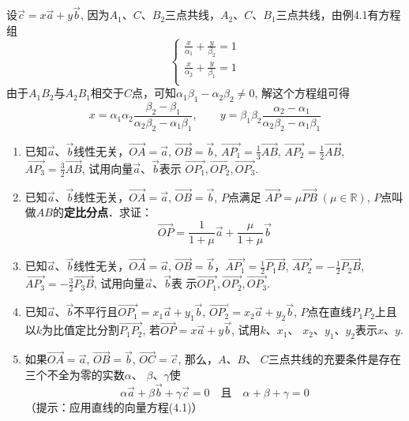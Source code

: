 \begin{solution}
    设$\vec{c}=x\vec{a}+y\vec{b}$, 因为$A_1$、$C$、$B_2$三点共线，$A_2$、$C$、$B_1$三点共线，由例4.1有方程组
\[\begin{cases}
    \frac{x}{\alpha_1}+\frac{y}{\beta_2}=1\\
    \frac{x}{\alpha_2}+\frac{y}{\beta_1}=1\\
\end{cases}\]
由于$A_1B_2$与$A_2B_1$相交于$C$点，可知$\alpha_1\beta_1-\alpha_2\beta_2\ne 0$, 解这个方程组可得
\[x=\alpha_1\alpha_2\frac{\beta_2-\beta_1}{\alpha_2\beta_2-\alpha_1\beta_1},\qquad y=\beta_1\beta_2\frac{\alpha_2-\alpha_1}{\alpha_2\beta_2-\alpha_1\beta_1}\]
\end{solution}

\begin{ex}
\begin{enumerate}
    \item 已知$\vec{a}$、$\vec{b}$线性无关，$\Vec{OA}=\vec{a}$, $\Vec{OB}=\vec{b}$, $\Vec{AP_1}=\frac{1}{3}\Vec{AB}$,
    $\Vec{AP_2}=\frac{1}{2}\Vec{AB}$, $\Vec{AP_3}=\frac{3}{2}\Vec{AB}$,
    试用向量$\vec{a}$、$\vec{b}$表示
    $\Vec{OP_1},\Vec{OP_2},\Vec{OP_3}$.

    \item 已知$\vec{a}$、$\vec{b}$线性无关，$\Vec{OA}=\vec{a}$, $\Vec{OB}=\vec{b}$, $P$点满足
    $\Vec{AP}=\mu \Vec{PB}\;  (\mu\in\mathbb{R})$, $P$点叫做$AB$的\textbf{定比分点}．求证：
\[\Vec{OP}=\frac{1}{1+\mu}\vec{a}+\frac{\mu}{1+\mu}\vec{b}\]
    \item 已知$\vec{a}$、$\vec{b}$线性无关，$\Vec{OA}=\vec{a}$, $\Vec{OB}=\vec{b}$，$\Vec{AP_1}=\frac{1}{2}\Vec{P_1B}$,
    $\Vec{AP_2}=-\frac{1}{2}\Vec{P_2B}$, $\Vec{AP_3}=-\frac{3}{2}\Vec{P_3B}$, 
    试用向量$\vec{a}$、$\vec{b}$表
    示$\Vec{OP_1},\Vec{OP_2},\Vec{OP_3}$.
    \item 已知$\vec{a}$、$\vec{b}$不平行且$\Vec{OP_1}=
    x_1\vec{a}+y_1\vec{b}$, $\Vec{OP_2}=x_2\vec{a}+y_2\vec{b}$, 
    $P$点在直线$P_1P_2$上且以$k$为比值定比分割$\Vec{P_1P_2}$,
    若$\Vec{OP}=x\vec{a}+y\vec{b}$, 
    试用$k$、$x_1$、
    $x_2$、$y_1$、$y_2$表示$x$、$y$.
    \item 如果$\Vec{OA}=\vec{a}$, $\Vec{OB}=\vec{b}$, $\Vec{OC}=\vec{c}$, 那么，$A$、$B$、
    $C$三点共线的充要条件是存在三个不全为零的实数$\alpha$、
    $\beta$、$\gamma$使
  \[  \alpha\vec{a}+\beta\vec{b}+\gamma\vec{c}=0\quad \text{且}\quad \alpha+\beta+\gamma=0\]
    （提示：应用直线的向量方程(4.1)）
\end{enumerate}
\end{ex}

